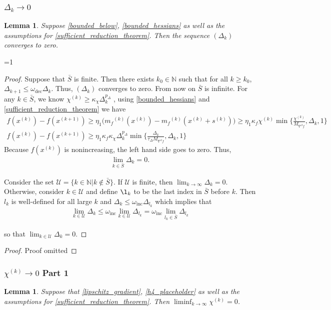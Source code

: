 \documentclass{article}
\newtheorem{lemma}[theorem]{Lemma}
\theoremstyle{case}
\newcommand{\xk}{{x^{(k)}}}
\newcommand{\xkpo}{{{x}^{(k+1)}}}
\newcommand{\dk}{\Delta_k}
\newcommand{\mfk}{{{m}_f}^{(k)}}
\newcommand{\sk}{{{s}^{(k)}}}
\newcommand{\chik}{{\chi^{(k)}}}
\newcommand{\omegainc}{\omega_{\text{inc}}}
\newcommand{\omegadec}{\omega_{\text{dec}}}
\newcommand{\ints}{\mathbb N} %
\newcommand{\oalpha}{\tau_{\Delta}}
\newcommand{\dkpo}{\Delta_{k+1}}
\newcommand{\hfb}{{M_{\nabla^2 f}}}
\def\includeproofs{1}
\begin{document}
\subsubsection{$\Delta_k \to 0$}
\begin{lemma}
\label{delta_to_zero}
Suppose \cref{bounded_below}, \cref{bounded_hessians} as well as the assumptions for \cref{sufficient_reduction_theorem}. Then the sequence $(\dk)$ converges to zero.
\end{lemma}
 
\ifnum\includeproofs=1
\begin{proof}

Suppose that $\bar{S}$ is finite. Then there exists $k_0 \in \ints$ such that for all $k \ge  k_0$, $\dkpo \le \omegadec \dk$.
Thus, $(\dk)$ converges to zero.
From now on $\bar{S}$ is infinite.  
For any $k \in \bar{S}$, we know $\chik \ge \kappa_{\chi}\dk^{p_{\Delta}}$ , using \cref{bounded_hessians} and \cref{sufficient_reduction_theorem} we have
\begin{align*}
f(\xk) -  f(\xkpo) \ge \eta_1 \big (\mfk(\xk) - \mfk(\xk + \sk)\big ) \ge \eta_1 \kappa_f \chik \min\{\frac{\chik}{\hfb}, \dk, 1\}\\
f(\xk) - f(\xkpo) \ge \eta_1\kappa_f \kappa_{\chi}\dk^{p_{\Delta}}\min\{\frac{\dk}{\oalpha \hfb}, \dk, 1\}
\end{align*}
Because $f(\xk)$ is nonincreasing, the left hand side goes to zero.
Thus,
\begin{align}
\lim_{k \in \bar{S}} \dk = 0.
\end{align}

Consider the set
$\mathcal U = \{ k \in \ints | k \not \in \bar S \}$.
If $\mathcal U$ is finite, then $\lim_{k\to\infty}\dk = 0$.
Otherwise, consider $k \in \mathcal U$ and define $\l_k$ to be the last index in $\bar S$ before $k$.
Then $l_k$ is well-defined for all large $k$  and $\dk \le \omegainc \Delta_{l_k}$ which implies that
\begin{align}
\lim_{k \in \mathcal U } \dk \le \omegainc \lim_{k \in \mathcal U} \Delta_{l_k} = \omegainc \lim_{l_k \in \bar{S}} \Delta_{l_k}
\end{align}

so that $\lim_{k \in \mathcal U} \dk = 0$.
\end{proof}
\else
\begin{proof}
Proof omitted
\end{proof}
\fi


\subsubsection{$\chik \to 0$ Part 1}
\begin{lemma}
\label{liminf_chi_to_zero}
Suppose that \cref{lipschitz_gradient}, \cref{h4_placeholder} as well as the assumptions for \cref{sufficient_reduction_theorem}. Then $\liminf_{k\to\infty} \chik = 0$.
\end{lemma}
 
\end{document}
